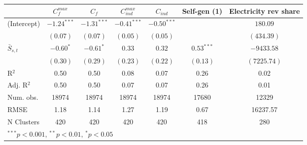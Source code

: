 
\begin{tabular}{l c c c c c c }
\toprule
 & $C^{max}_{f}$ & $C_{f}$ & $C^{max}_{ind}$ & $C_{ind}$ & Self-gen (1) & Electricity rev share \\
\midrule
(Intercept)     & $-1.24^{***}$ & $-1.31^{***}$ & $-0.41^{***}$ & $-0.50^{***}$ &              & $180.09$    \\
                & $(0.07)$      & $(0.07)$      & $(0.05)$      & $(0.05)$      &              & $(434.39)$  \\
$\bar{S}_{s,t}$ & $-0.60^{*}$   & $-0.61^{*}$   & $0.33$        & $0.32$        & $0.53^{***}$ & $-9433.58$  \\
                & $(0.30)$      & $(0.29)$      & $(0.23)$      & $(0.22)$      & $(0.13)$     & $(7225.74)$ \\
\midrule
R$^2$           & 0.50          & 0.50          & 0.08          & 0.07          & 0.26         & 0.02        \\
Adj. R$^2$      & 0.50          & 0.50          & 0.07          & 0.07          & 0.26         & 0.01        \\
Num. obs.       & 18974         & 18974         & 18974         & 18974         & 17680        & 12329       \\
RMSE            & 1.18          & 1.14          & 1.27          & 1.19          & 0.67         & 16237.57    \\
N Clusters      & 420           & 420           & 420           & 420           & 418          & 280         \\
\bottomrule
\multicolumn{7}{l}{\tiny{$^{***}p<0.001$, $^{**}p<0.01$, $^*p<0.05$}}
\end{tabular}
